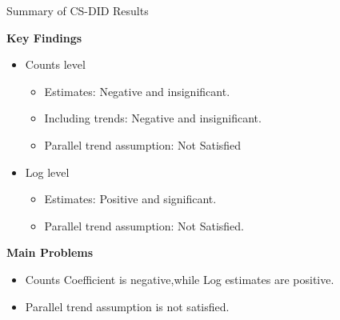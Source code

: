 \documentclass{beamer}
\begin{document}
\begin{frame}{Summary of CS-DID Results}

\textbf{Key Findings}

\begin{itemize}
    \item Counts level
    \begin{itemize}
        \item Estimates: Negative and insignificant.
        \item Including  trends: Negative and insignificant.
        \item Parallel trend assumption: Not Satisfied
    \end{itemize}

    \item Log level
    \begin{itemize}
    \item  Estimates: Positive and  significant.
    \item Parallel trend assumption: Not Satisfied.
    \end{itemize}

\end{itemize}

\textbf{Main  Problems}
\begin{itemize}
    \item Counts Coefficient is negative,while Log estimates are positive.
    \item Parallel trend assumption is not satisfied.
\end{itemize}

\end{frame}



\end{document}
